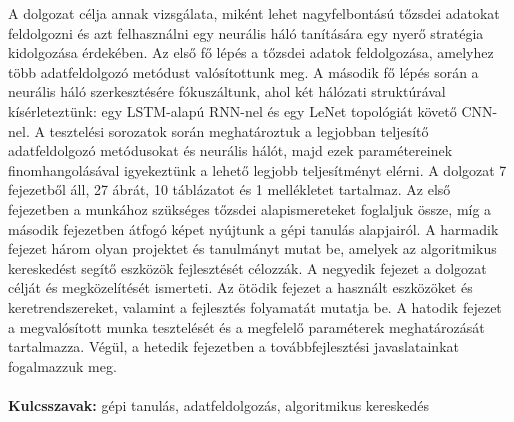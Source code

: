 \documentclass[a4paper,oneside,onecolumn,12pt]{book}
\begin{document}
\label{sec:absztrakt}
\thispagestyle{empty}
A dolgozat célja annak vizsgálata, miként lehet nagyfelbontású tőzsdei adatokat feldolgozni és azt felhasználni egy neurális háló tanítására egy nyerő stratégia kidolgozása érdekében. Az első fő lépés a tőzsdei adatok feldolgozása, amelyhez több adatfeldolgozó metódust valósítottunk meg. A második fő lépés során a neurális háló szerkesztésére fókuszáltunk, ahol két hálózati struktúrával kísérleteztünk: egy LSTM-alapú RNN-nel és egy LeNet topológiát követő CNN-nel. A tesztelési sorozatok során meghatároztuk a legjobban teljesítő adatfeldolgozó metódusokat és neurális hálót, majd ezek paramétereinek finomhangolásával igyekeztünk a lehető legjobb teljesítményt elérni. A dolgozat 7 fejezetből áll, 27 ábrát, 10 táblázatot és 1 mellékletet tartalmaz. Az első fejezetben a munkához szükséges tőzsdei alapismereteket foglaljuk össze, míg a második fejezetben átfogó képet nyújtunk a gépi tanulás alapjairól. A harmadik fejezet három olyan projektet és tanulmányt mutat be, amelyek az algoritmikus kereskedést segítő eszközök fejlesztését célozzák. A negyedik fejezet a dolgozat célját és megközelítését ismerteti. Az ötödik fejezet a használt eszközöket és keretrendszereket, valamint a fejlesztés folyamatát mutatja be. A hatodik fejezet a megvalósított munka tesztelését és a megfelelő paraméterek meghatározását tartalmazza. Végül, a hetedik fejezetben a továbbfejlesztési javaslatainkat fogalmazzuk meg.
\\\\
\textbf{Kulcsszavak:} gépi tanulás, adatfeldolgozás, algoritmikus kereskedés

\pagebreak
\end{document}

